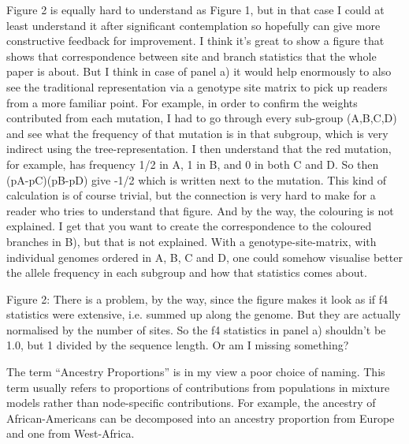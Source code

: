 \begin{point}{}
Figure 2 is equally hard to understand as Figure 1, but in that case I could at least understand it after significant contemplation so hopefully can give more constructive feedback for improvement. I think it's great to show a figure that shows that correspondence between site and branch statistics that the whole paper is about. But I think in case of panel a) it would help enormously to also see the traditional representation via a genotype site matrix to pick up readers from a more familiar point. For example, in order to confirm the weights contributed from each mutation, I had to go through every sub-group (A,B,C,D) and see what the frequency of that mutation is in that subgroup, which is very indirect using the tree-representation. I then understand that the red mutation, for example, has frequency 1/2 in A, 1 in B, and 0 in both C and D. So then (pA-pC)(pB-pD) give -1/2 which is written next to the mutation. This kind of calculation is of course trivial, but the connection is very hard to make for a reader who tries to understand that figure. And by the way, the colouring is not explained. I get that you want to create the correspondence to the coloured branches in B), but that is not explained. With a genotype-site-matrix, with individual genomes ordered in A, B, C and D, one could somehow visualise better the allele frequency in each subgroup and how that statistics comes about.
\end{point}


\begin{point}{Figure 2:}
There is a problem, by the way, since the figure makes it look as if f4 statistics were extensive, i.e. summed up along the genome. But they are actually normalised by the number of sites. So the f4 statistics in panel a) shouldn't be 1.0, but 1 divided by the sequence length. Or am I missing something?
\end{point}

\reply{
}



\begin{point}{\revref}
        The term ``Ancestry Proportions'' is in my view a poor choice of naming. This term usually refers to proportions of contributions from populations in mixture models rather than node-specific contributions. For example, the ancestry of African-Americans can be decomposed into an ancestry proportion from Europe and one from West-Africa.
\end{point}

